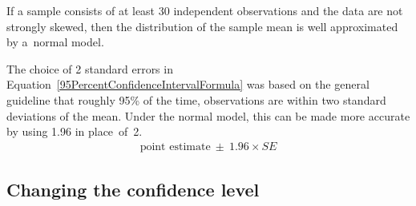 \begin{spacing}{1.5}
\begin{termBox}{
If a sample consists of at least 30 independent observations and the data are not strongly skewed, then the distribution of the sample mean is well approximated by a~normal model.}
\end{termBox}

The choice of 2 standard errors in Equation~\ref{95PercentConfidenceIntervalFormula} was based on the general guideline that roughly 95\% of the time, observations are within two standard deviations of the mean. Under the normal model, this can be made more accurate by using 1.96 in place~of~2.
\begin{align}
\text{point estimate}\ \pm\ 1.96\times SE
\label{95PercentCIWhenUsingNormalModel}
\end{align}


\subsection{Changing the confidence level}
\label{changingTheConfidenceLevelSection}






\end{spacing}
